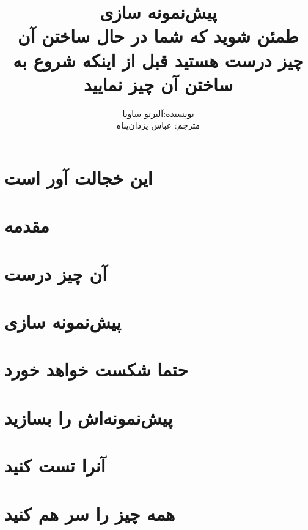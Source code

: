 \documentclass[a5paper,14pt]{book}
\author{نویسنده:آلبرتو ساویا
\\ مترجم: عباس یزدان‌پناه}
\title{پیش‌نمونه سازی
\\
طمئن شوید که شما در حال ساختن  آن چیز درست هستید قبل از اینکه شروع به ساختن آن چیز نمایید}
\begin{document}
\maketitle
\frontmatter
\tableofcontents

\chapter{این خجالت آور است}

\chapter{مقدمه}

\mainmatter
\chapter{آن چیز درست}

\chapter{پیش‌نمونه سازی}

\chapter{حتما شکست خواهد خورد}

\chapter{پیش‌نمونه‌اش را بسازید}

\chapter{‌آنرا تست کنید}

\chapter{همه چیز را سر هم کنید}

\end{document}
